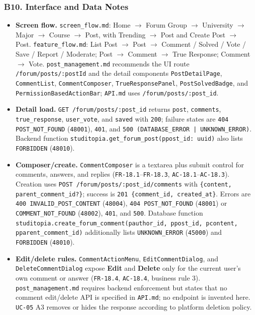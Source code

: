 \documentclass[12pt]{article}
\begin{document}
\hypertarget{sec:b10-interface-and-data-notes}{}
\subsubsection*{B10. Interface and Data Notes}
\par\medskip

\begin{itemize}
\item \textbf{Screen flow.} \texttt{screen\_flow.md}: Home $\rightarrow$ Forum Group $\rightarrow$ University $\rightarrow$ Major $\rightarrow$ Course $\rightarrow$ Post, with Trending $\rightarrow$ Post and Create Post $\rightarrow$ Post. \texttt{feature\_flow.md}: List Post $\rightarrow$ Post $\rightarrow$ Comment / Solved / Vote / Save / Report / Moderate; Post $\rightarrow$ Comment $\rightarrow$ True Response; Comment $\rightarrow$ Vote. \texttt{post\_management.md} recommends the UI route \texttt{/forum/posts/:postId} and the detail components \texttt{PostDetailPage}, \texttt{CommentList}, \texttt{CommentComposer}, \texttt{TrueResponsePanel}, \texttt{PostSolvedBadge}, and \texttt{PermissionBasedActionBar}; \texttt{API.md} uses \texttt{/forum/posts/:post\_id}.
\item \textbf{Detail load.} \texttt{GET /forum/posts/:post\_id} returns \texttt{post}, \texttt{comments}, \texttt{true\_response}, \texttt{user\_vote}, and \texttt{saved} with \texttt{200}; failure states are \texttt{404 POST\_NOT\_FOUND} (\texttt{48001}), \texttt{401}, and \texttt{500 (DATABASE\_ERROR | UNKNOWN\_ERROR)}. Backend function \texttt{studitopia.get\_forum\_post(ppost\_id: uuid)} also lists \texttt{FORBIDDEN} (\texttt{48010}).
\item \textbf{Composer/create.} \texttt{CommentComposer} is a textarea plus submit control for comments, answers, and replies (\texttt{FR-18.1}--\texttt{FR-18.3}, \texttt{AC-18.1}--\texttt{AC-18.3}). Creation uses \texttt{POST /forum/posts/:post\_id/comments} with \texttt{\{content, parent\_comment\_id?\}}; success is \texttt{201 \{comment\_id, created\_at\}}. Errors are \texttt{400 INVALID\_POST\_CONTENT} (\texttt{48004}), \texttt{404 POST\_NOT\_FOUND} (\texttt{48001}) or \texttt{COMMENT\_NOT\_FOUND} (\texttt{48002}), \texttt{401}, and \texttt{500}. Database function \texttt{studitopia.create\_forum\_comment(pauthor\_id, ppost\_id, pcontent, pparent\_comment\_id)} additionally lists \texttt{UNKNOWN\_ERROR} (\texttt{45000}) and \texttt{FORBIDDEN} (\texttt{48010}).
\item \textbf{Edit/delete rules.} \texttt{CommentActionMenu}, \texttt{EditCommentDialog}, and \texttt{DeleteCommentDialog} expose \textbf{Edit} and \textbf{Delete} only for the current user's own comment or answer (\texttt{FR-18.4}, \texttt{AC-18.4}, business rule 3). \texttt{post\_management.md} requires backend enforcement but states that no comment edit/delete API is specified in \texttt{API.md}; no endpoint is invented here. \texttt{UC-05} A3 removes or hides the response according to platform deletion policy.

\end{itemize}
\end{document}
